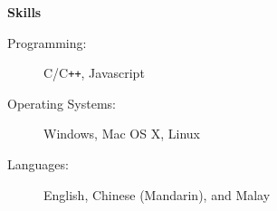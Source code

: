 \documentclass[letterpaper,11pt]{article}
\newcommand{\resheading}[1]{{\begin{mdframed}[backgroundcolor=mygray]{\large \textbf{#1}}\end{mdframed}}}
\begin{document}

\resheading{Skills}

\begin{description}
\item[Programming:]
C/C{}\verb!++!, Javascript
\item[Operating Systems:]
Windows, Mac OS X, Linux
\item[Languages:]
English, Chinese (Mandarin), and Malay
\end{description}
\end{document}
